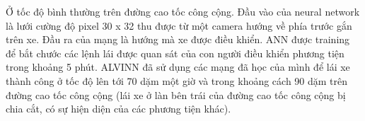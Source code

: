 Ở tốc độ bình thường trên đường cao tốc công cộng. Đầu vào của neural network là lưới cường độ pixel 30 x 32 thu được từ một camera hướng về phía trước gắn trên xe. Đầu ra của mạng là hướng mà xe được điều khiển. ANN được training để bắt chước các lệnh lái được quan sát của con người điều khiển phương tiện trong khoảng 5 phút. ALVINN đã sử dụng các mạng đã học của mình để lái xe thành công ở tốc độ lên tới 70 dặm một giờ và trong khoảng cách 90 dặm trên đường cao tốc công cộng (lái xe ở làn bên trái của đường cao tốc công cộng bị chia cắt, có sự hiện diện của các phương tiện khác).


